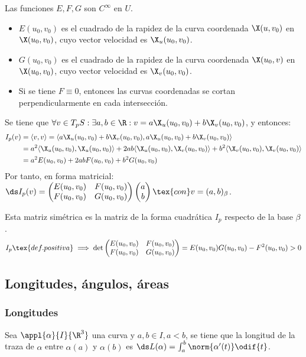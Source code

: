 Las funciones $E, F, G$ son $C^\infty$ en $U$.
\begin{itemize}
	\item $E(u_0, v_0)$ es el cuadrado de la rapidez de la curva coordenada $\X(u, v_0)$ en $\X(u_0, v_0)$, cuyo vector velocidad es $\X_u(u_0, v_0)$.
	\item $G(u_0, v_0)$ es el cuadrado de la rapidez de la curva coordenada $\X(u_0, v)$ en $\X(u_0, v_0)$, cuyo vector velocidad es $\X_v(u_0, v_0)$.
	\item Si se tiene $F\equiv 0$, entonces las curvas coordenadas se cortan perpendicularmente en cada intersección.
\end{itemize}
Se tiene que $\forall v \in T_pS : \exists a, b \in \R : v = a\X_u(u_0, v_0) + b\X_v(u_0, v_0)$, y entonces:
\[
	\begin{aligned}
		I_p(v) & = \langle v, v \rangle = \langle a\X_u(u_0, v_0) + b\X_v(u_0, v_0), a\X_u(u_0, v_0) + b\X_v(u_0, v_0) \rangle                                               \\
		       & = a^2\langle \X_u(u_0, v_0), \X_u(u_0, v_0) \rangle + 2ab\langle \X_u(u_0, v_0), \X_v(u_0, v_0) \rangle + b^2\langle \X_v(u_0, v_0), \X_v(u_0, v_0) \rangle \\
		       & = a^2E(u_0, v_0) + 2abF(u_0, v_0) + b^2G(u_0, v_0)
	\end{aligned}\]
Por tanto, en forma matricial: $\ds I_p(v) = \begin{pmatrix}
		E(u_0, v_0) & F(u_0, v_0) \\
		F(u_0, v_0) & G(u_0, v_0)
	\end{pmatrix}\begin{pmatrix}a\\b\end{pmatrix} \tex{ con } v = (a, b)_{\beta}$.

Esta matriz simétrica es la matriz de la forma cuadrática $I_p$ respecto de la base $\beta$.
\[I_p \tex{ def. positiva } \implies \det{\begin{pmatrix}
			E(u_0, v_0) & F(u_0, v_0) \\
			F(u_0, v_0) & G(u_0, v_0)
		\end{pmatrix}} = E(u_0, v_0)G(u_0, v_0) - F^2(u_0, v_0) > 0\]

\subsection{Longitudes, ángulos, áreas}

\subsubsection{Longitudes}

Sea $\appl{\alpha}{I}{\R^3}$ una curva y $a, b \in I, a < b$, se tiene que la longitud de la traza de $\alpha$ entre $\alpha(a)$ y $\alpha(b)$ es $\ds L(\alpha) = \int_{a}^{b} \norm{\alpha'(t)} \odif{t}$.